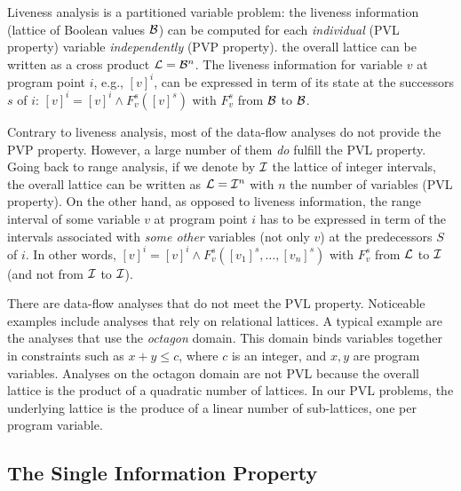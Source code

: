 Liveness analysis is a partitioned variable problem:
the liveness information (lattice of Boolean values ${\cal B}$) can be computed for each \emph{individual} (PVL property) variable \emph{independently} (PVP property).
the overall lattice can be written as a cross product ${\cal L}={\cal B}^n$.
The liveness information for variable $v$ at program point $i$, e.g., $[v]^i$, can be expressed in term of its state at the successors $s$ of $i$:
$[v]^i = [v]^i \wedge F_v^s([v]^s)$ with $F_v^s$ from $\cal B$ to $\cal B$.

Contrary to liveness analysis, most of the data-flow analyses do not provide the PVP property.
However, a large number of them \emph{do} fulfill the PVL property.
Going back to range analysis, if we denote by $\cal I$ the lattice of integer intervals, the overall lattice can be written as ${\cal L}={\cal I}^n$ with $n$ the number of variables (PVL property).
On the other hand, as opposed to liveness information, the range interval of some variable $v$ at program point $i$ has to be expressed in term of the intervals associated with \emph{some other} variables (not only $v$) at the predecessors $S$ of $i$.
In other words,  $[v]^i = [v]^i \wedge  F_v^s([v_1]^s,\dots,[v_n]^s)$ with $F_v^s$ from $\cal L$ to $\cal I$ (and not from $\cal I$ to $\cal I$).

There are data-flow analyses that do not meet the PVL property.
Noticeable examples include analyses that rely on relational lattices.
A typical example are the analyses that use the {\em octagon} domain.
This domain binds variables together in constraints such as $x + y \leq c$, where $c$ is an integer, and $x, y$ are program variables.
Analyses on the octagon domain are not PVL because the overall lattice is the product of a quadratic number of lattices.
In our PVL problems, the underlying lattice is the produce of a linear number of sub-lattices, one per program variable.


\subsection{The Single Information Property}
\label{sec:ssi:pereira:singProp}

